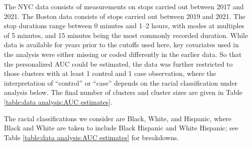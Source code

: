 \documentclass[12pt]{article}
\begin{document}
The NYC data consists of measurements on
 stops carried out between 2017
and 2021. The Boston data consists of
 stops carried out between 2019 and
2021. The stop durations range between 0 minutes and 1--2 hours, with modes at multiples of 5
minutes, and 15 minutes being the most commonly recorded duration.  While data is available
for years prior to the cutoffs used here, key covariates used in the
analysis were either missing or coded differently in the earlier
data. So that the personalized AUC could be estimated, the data was
further restricted to those clusters with at least 1 control and 1
case observation, where the interpretation of ``control'' or ``case''
depends on the racial classification under analysis below. The final number of clusters and cluster sizes are
given in Table \ref{table:data analysis:AUC estimates}.




The racial classifications we consider are Black, White, and Hispanic,
where Black and White are taken to include Black Hispanic and White
Hispanic; see Table \ref{table:data analysis:AUC estimates} for breakdowns.
\end{document}
